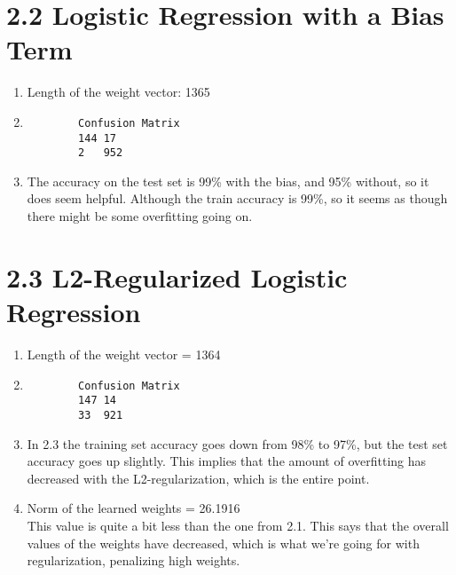 \documentclass[12pt]{article}
\begin{document}
	\section*{2.2 Logistic Regression with a Bias Term}
	\begin{enumerate}
		\item Length of the weight vector: 1365
		\item \begin{verbatim}
		Confusion Matrix
		144	17
		2	952
		\end{verbatim}
		\item The accuracy on the test set is 99\% with the bias, and 95\% without, so it does seem helpful. Although the train accuracy is 99\%, so it seems as though there might be some overfitting going on.
	\end{enumerate}
	
	\section*{2.3 L2-Regularized Logistic Regression}
	\begin{enumerate}
		\item Length of the weight vector = 1364
		\item \begin{verbatim}
		Confusion Matrix
		147	14
		33	921
		\end{verbatim}
		\item In 2.3 the training set accuracy goes down from 98\% to 97\%, but the test set accuracy goes up slightly. This implies that the amount of overfitting has decreased with the L2-regularization, which is the entire point.
		
		\item Norm of the learned weights = 26.1916\\
		This value is quite a bit less than the one from 2.1. This says that the overall values of the weights have decreased, which is what we're going for with regularization, penalizing high weights.
	\end{enumerate}
\end{document}

